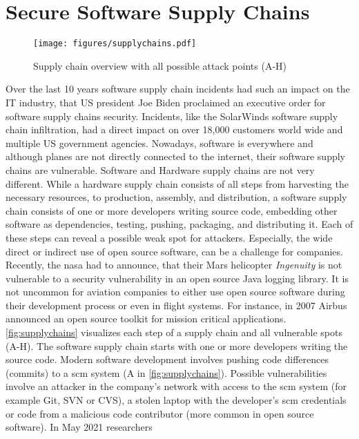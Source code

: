 \documentclass[titlepage]{report}
\begin{document}
\section{Secure Software Supply Chains}
\begin{figure}[H]
  \centering
  \texttt{[image: figures/supplychains.pdf]}
  \caption{Supply chain overview with all possible attack points (A-H)\cite{GoogleSecurityBlog}}\label{fig:supplychains}
\end{figure}
Over the last 10 years software supply chain incidents had such an impact on the IT industry, that US president Joe Biden proclaimed an executive order for
software supply chains security\cite{ExecutiveOrder}. Incidents, like the SolarWinds software supply chain infiltration, had a direct impact on over 18,000 customers world wide
and multiple US government agencies. Nowadays, software is everywhere and although planes are not directly connected to the internet, their software supply chains are vulnerable.
Software and Hardware supply chains are not very different. While a hardware supply chain consists of all steps from harvesting the necessary resources, to production, assembly,
and distribution, a software supply chain consists of one or more developers writing source code, embedding other software as dependencies, testing, pushing, packaging, and distributing it. 
Each of these steps can reveal a possible weak spot for attackers. Especially, the wide direct or indirect use of open source software, can be a challenge for companies.
Recently, the \gls{nasa} had to announce, that their Mars helicopter \emph{Ingenuity} is not vulnerable to a security vulnerability in an open source Java logging library\cite{MarsHelicopter}.
It is not uncommon for aviation companies to either use open source software during their development process or even in flight systems. For instance, in 2007 Airbus announced an open source toolkit for mission critical applications\cite{Topcased}.
\autoref{fig:supplychains} visualizes each step of a supply chain and all vulnerable spots (A-H). The software supply chain starts with one or more developers writing the source code. Modern software development
involves pushing code differences (commits) to a \gls{scm} system (A in \autoref{fig:supplychains}). Possible vulnerabilities involve an attacker in the company's network with access to the \gls{scm} system (for example Git, SVN or CVS),
a stolen laptop with the developer's \gls{scm} credentials or code from a malicious code contributor (more common in open source software). In May 2021 researchers 
\end{document}
